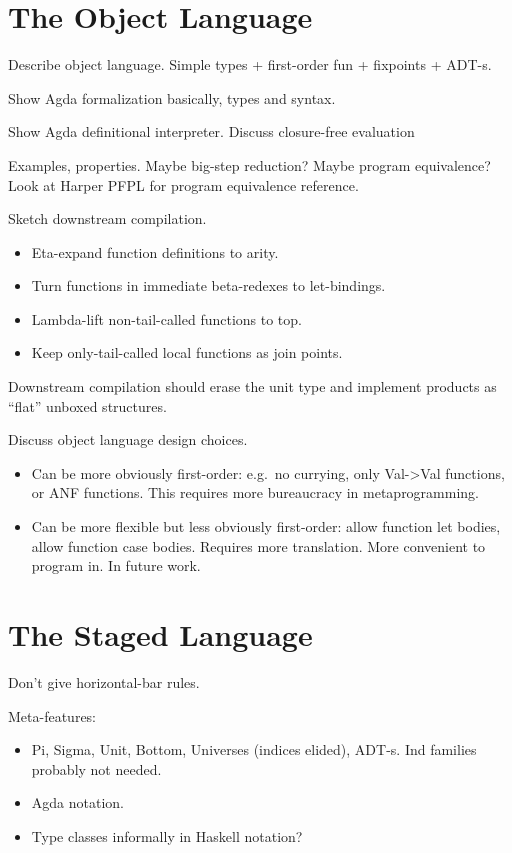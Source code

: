 \documentclass[acmsmall,screen,review,anonymous]{acmart}
\begin{document}
\section{The Object Language}\label{sec:the-object-language}

Describe object language. Simple types + first-order fun + fixpoints + ADT-s.

Show Agda formalization basically, types and syntax.

Show Agda definitional interpreter. Discuss closure-free evaluation

Examples, properties. Maybe big-step reduction? Maybe program equivalence?  Look
at Harper PFPL for program equivalence reference.

Sketch downstream compilation.
\begin{itemize}
\item Eta-expand function definitions to arity.
\item Turn functions in immediate beta-redexes to let-bindings.
\item Lambda-lift non-tail-called functions to top.
\item Keep only-tail-called local functions as join points.
\end{itemize}

Downstream compilation should erase the unit type and implement products as
``flat'' unboxed structures.

Discuss object language design choices.
\begin{itemize}
\item Can be more obviously first-order: e.g.\ no currying, only Val->Val
  functions, or ANF functions. This requires more bureaucracy in
  metaprogramming.
\item Can be more flexible but less obviously first-order: allow function let
  bodies, allow function case bodies. Requires more translation. More convenient
  to program in. In future work.
\end{itemize}

\section{The Staged Language}\label{sec:the-staged-language}

Don't give horizontal-bar rules.

Meta-features:
\begin{itemize}
\item Pi, Sigma, Unit, Bottom, Universes (indices elided), ADT-s. Ind families probably not needed.
\item Agda notation.
\item Type classes informally in Haskell notation?
\end{itemize}
\end{document}

